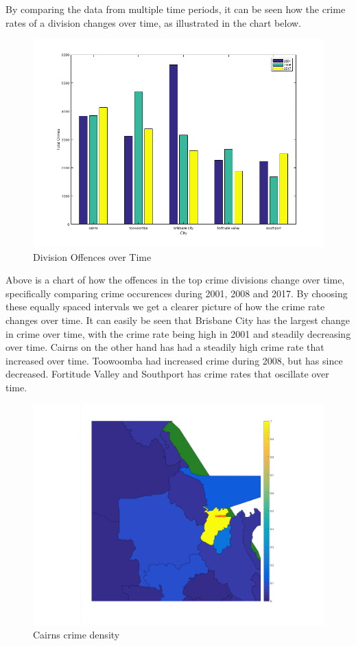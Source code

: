 \documentclass[]{article}
\begin{document}
By comparing the data from multiple time periods, it can be seen how the crime rates of a division changes over time, as illustrated in the chart below.

\begin{figure}[H]
    \caption{Division Offences over Time}
    \centering
    \includegraphics[width=\linewidth]{../images/top_crime_range}
\end{figure}

Above is a chart of how the offences in the top crime divisions change over time,
specifically comparing crime occurences during 2001, 2008 and 2017.
By choosing these equally spaced intervals we get a clearer picture of how the crime rate changes over time.
It can easily be seen that Brisbane City has the largest change in crime over time, with the crime rate being high in 2001 and steadily decreasing over time.
Cairns on the other hand has had a steadily high crime rate that increased over time.
Toowoomba had increased crime during 2008, but has since decreased.
Fortitude Valley and Southport has crime rates that oscillate over time.

\begin{figure}[H]
    \caption{Cairns crime density}
    \centering
    \label{fig:cairns_crime}
    \includegraphics[width=\linewidth]{../images/cairns_crime}
\end{figure}
\end{document}
